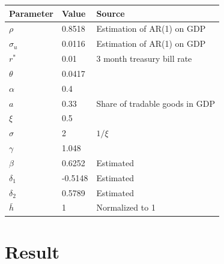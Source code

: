 \documentclass[mathserif]{beamer}
\begin{document}
    \begin{frame}
        \centering
        \begin{tabular}{@{}lll@{}}
        \toprule
        Parameter  & Value  & Source                                                                         \\ 
        \midrule

        $\rho$     & 0.8518 & Estimation of AR(1) on GDP\\
        $\sigma_u$ & 0.0116 & Estimation of AR(1) on GDP\\
        $r^*$      & 0.01 & 3 month treasury bill rate \\
        $\theta$   & 0.0417 & \citet*{trebesch-2011-sovereign}                                              \\
        $\alpha$   & 0.4   & \citet{Pakistan-DSGE-calibration}                                                       \\
        $a$        & 0.33   &Share of tradable goods in GDP                    \\
        $\xi$      & 0.5   & \citet{Na-18}                              \\
        $\sigma$   & 2   & $1 / \xi$                                                                      \\
        $\gamma$   & 1.048   & \citet*{wage-rigidity-data}                  \\
        $\beta$    & 0.6252  &  Estimated \\
        $\delta_1$ &  -0.5148 &   Estimated  \\
        $\delta_2$ &  0.5789   &     Estimated   \\
        $\bar{h}$  & 1      & Normalized to 1\\
        \bottomrule
        \end{tabular}%
    \end{frame}

    \section{Result}
\end{document}
